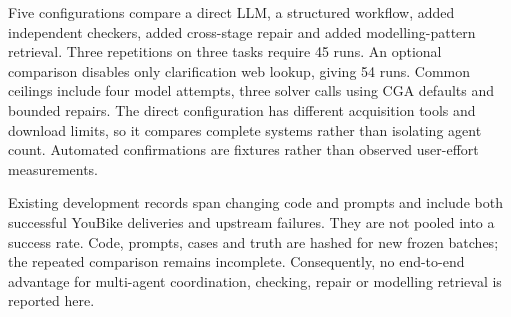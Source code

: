 Five configurations compare a direct LLM, a structured workflow, added independent checkers, added cross-stage
repair and added modelling-pattern retrieval. Three repetitions on three tasks require 45 runs. An optional
comparison disables only clarification web lookup, giving 54 runs. Common ceilings include four model attempts,
three solver calls using CGA defaults and bounded repairs. The direct configuration has different acquisition
tools and download limits, so it compares complete systems rather than isolating agent count. Automated
confirmations are fixtures rather than observed user-effort measurements.

Existing development records span changing code and prompts and include both successful YouBike deliveries
and upstream failures. They are not pooled into a success rate. Code, prompts, cases and truth are hashed for
new frozen batches; the repeated comparison remains incomplete. Consequently, no end-to-end advantage for
multi-agent coordination, checking, repair or modelling retrieval is reported here.
